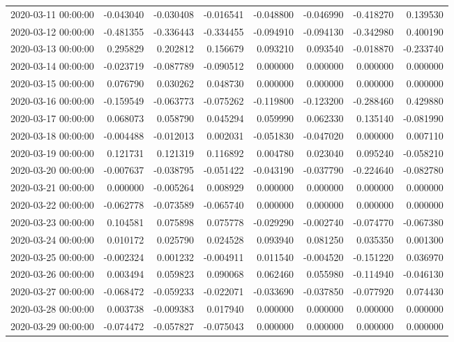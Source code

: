 \begin{tabular}{lrrrrrrr}
2020-03-11 00:00:00 & -0.043040 & -0.030408 & -0.016541 & -0.048800 & -0.046990 & -0.418270 & 0.139530 \\
2020-03-12 00:00:00 & -0.481355 & -0.336443 & -0.334455 & -0.094910 & -0.094130 & -0.342980 & 0.400190 \\
2020-03-13 00:00:00 & 0.295829 & 0.202812 & 0.156679 & 0.093210 & 0.093540 & -0.018870 & -0.233740 \\
2020-03-14 00:00:00 & -0.023719 & -0.087789 & -0.090512 & 0.000000 & 0.000000 & 0.000000 & 0.000000 \\
2020-03-15 00:00:00 & 0.076790 & 0.030262 & 0.048730 & 0.000000 & 0.000000 & 0.000000 & 0.000000 \\
2020-03-16 00:00:00 & -0.159549 & -0.063773 & -0.075262 & -0.119800 & -0.123200 & -0.288460 & 0.429880 \\
2020-03-17 00:00:00 & 0.068073 & 0.058790 & 0.045294 & 0.059990 & 0.062330 & 0.135140 & -0.081990 \\
2020-03-18 00:00:00 & -0.004488 & -0.012013 & 0.002031 & -0.051830 & -0.047020 & 0.000000 & 0.007110 \\
2020-03-19 00:00:00 & 0.121731 & 0.121319 & 0.116892 & 0.004780 & 0.023040 & 0.095240 & -0.058210 \\
2020-03-20 00:00:00 & -0.007637 & -0.038795 & -0.051422 & -0.043190 & -0.037790 & -0.224640 & -0.082780 \\
2020-03-21 00:00:00 & 0.000000 & -0.005264 & 0.008929 & 0.000000 & 0.000000 & 0.000000 & 0.000000 \\
2020-03-22 00:00:00 & -0.062778 & -0.073589 & -0.065740 & 0.000000 & 0.000000 & 0.000000 & 0.000000 \\
2020-03-23 00:00:00 & 0.104581 & 0.075898 & 0.075778 & -0.029290 & -0.002740 & -0.074770 & -0.067380 \\
2020-03-24 00:00:00 & 0.010172 & 0.025790 & 0.024528 & 0.093940 & 0.081250 & 0.035350 & 0.001300 \\
2020-03-25 00:00:00 & -0.002324 & 0.001232 & -0.004911 & 0.011540 & -0.004520 & -0.151220 & 0.036970 \\
2020-03-26 00:00:00 & 0.003494 & 0.059823 & 0.090068 & 0.062460 & 0.055980 & -0.114940 & -0.046130 \\
2020-03-27 00:00:00 & -0.068472 & -0.059233 & -0.022071 & -0.033690 & -0.037850 & -0.077920 & 0.074430 \\
2020-03-28 00:00:00 & 0.003738 & -0.009383 & 0.017940 & 0.000000 & 0.000000 & 0.000000 & 0.000000 \\
2020-03-29 00:00:00 & -0.074472 & -0.057827 & -0.075043 & 0.000000 & 0.000000 & 0.000000 & 0.000000 \\

\end{tabular}
